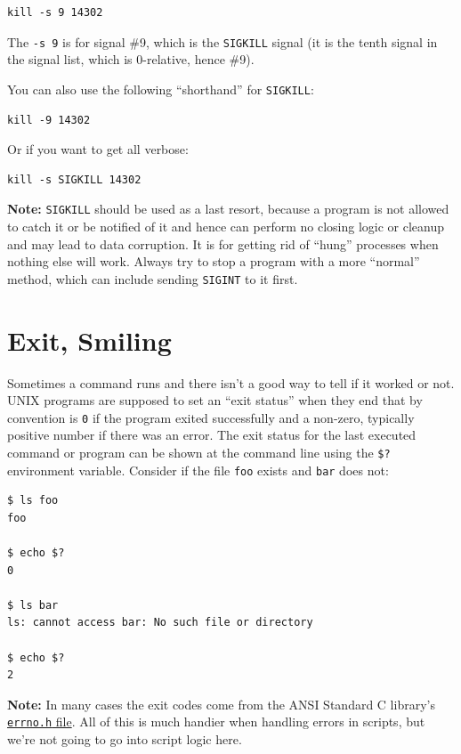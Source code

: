 \documentclass[10pt,]{book}
\numberwithin{figure}{chapter}
\begin{document}
\begin{verbatim}
kill -s 9 14302
\end{verbatim}

The \texttt{-s 9} is for signal \#9, which is the \texttt{SIGKILL}
signal (it is the tenth signal in the signal list, which is 0-relative,
hence \#9).

You can also use the following ``shorthand'' for \texttt{SIGKILL}:

\begin{verbatim}
kill -9 14302
\end{verbatim}

Or if you want to get all verbose:

\begin{verbatim}
kill -s SIGKILL 14302
\end{verbatim}

\textbf{Note:} \texttt{SIGKILL} should be used as a last resort, because
a program is not allowed to catch it or be notified of it and hence can
perform no closing logic or cleanup and may lead to data corruption. It
is for getting rid of ``hung'' processes when nothing else will work.
Always try to stop a program with a more ``normal'' method, which can
include sending \texttt{SIGINT} to it first.

\section{Exit, Smiling}\label{exit-smiling}

Sometimes a command runs and there isn't a good way to tell if it worked
or not. UNIX programs are supposed to set an ``exit status'' when they
end that by convention is \texttt{0} if the program exited successfully
and a non-zero, typically positive number if there was an error. The
exit status for the last executed command or program can be shown at the
command line using the \texttt{\$?} environment variable. Consider if
the file \texttt{foo} exists and \texttt{bar} does not:

\begin{verbatim}
$ ls foo
foo

$ echo $?
0

$ ls bar
ls: cannot access bar: No such file or directory

$ echo $?
2
\end{verbatim}

\textbf{Note:} In many cases the exit codes come from the ANSI Standard
C library's \href{http://mazack.org/unix/errno.php}{\texttt{errno.h}
file}. All of this is much handier when handling errors in scripts, but
we're not going to go into script logic here.
\end{document}
